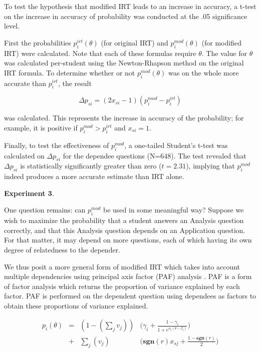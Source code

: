 \documentclass[a4paper,twocolumn]{article}
\begin{document}
To test the hypothesis that modified IRT leads to an increase in accuracy,
a t-test on the increase in accuracy of probability was conducted at the
.05 significance level.

First the probabilities $p_i^{irt}(\theta)$ (for original IRT) and
$p_i^{mod}(\theta)$ (for modified IRT) were calculated.  Note that each of
these formulas require $\theta$. The value for $\theta$ was calculated
per-student using the Newton-Rhapson method on the original IRT formula.  To
determine whether or not $p_i^{mod}(\theta)$ was on the whole more accurate
than $p_i^{irt}$, the result

\[
  \Delta p_{si} = (2x_{si}-1) (p_i^{mod} - p_i^{irt})
\]

was calculated. This represents the increase in accuracy of the probability;
for example, it is positive if $p_i^{mod} > p_i^{irt}$ and $x_{si} = 1$.

Finally, to test the effectiveness of $p_i^{mod}$, a one-tailed Student's
t-test was calculated on $\Delta p_{si}$ for the dependee questions (N=648).
The test revealed that $\Delta p_{si}$ is statistically significantly greater
than zero ($t=2.31$), implying that $p_i^{mod}$ indeed produces a more accurate
estimate than IRT alone. 


\textbf{Experiment 3}. 

One question remains: can $p_i^{mod}$ be used in some meaningful way?  Suppose
we wish to maximize the probability that a student answers an Analysis question
correctly, and that this Analysis question depends on an Application question.  
For that matter, it may depend on more questions, each of which having its own
degree of relatedness to the depender.

We thus posit a more general form of modified IRT which takes into account
multiple dependencies using principal axis factor (PAF) analysis
\cite{kim1978}.  PAF is a form of factor analysis which returns the proportion
of variance explained by each factor.  PAF is performed on the dependent
question using dependees as factors to obtain these proportions of variance
explained.

\begin{align*}
  p_i(\theta) &=& (1- (\displaystyle\sum_j v_j)) & \Big(\gamma_i + \frac{1-\gamma_i}{1+e^{\alpha_i(\theta-\beta_i)}}\Big) \\
              &+& \displaystyle\sum_j (v_j)   & \Big(\mathbf{sgn}(r)x_{sj}+\frac{1-\mathbf{sgn}(r)}{2}\Big)
\end{align*}
\end{document}
